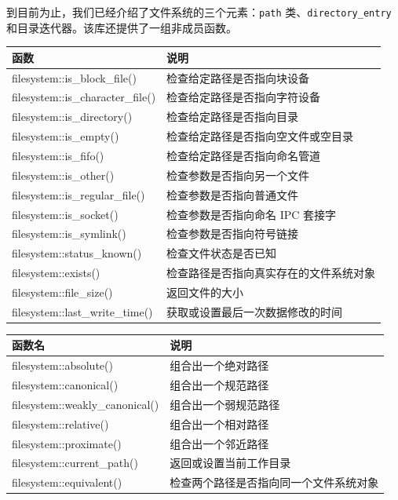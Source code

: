 到目前为止，我们已经介绍了文件系统的三个元素：\texttt{path} 类、\texttt{directory\_entry} 和目录迭代器。该库还提供了一组非成员函数。


\begin{table}[H]
\centering
\begin{tabularx}{\textwidth}{>{\ttfamily\raggedright\arraybackslash}X >{\raggedright\arraybackslash}X}
\toprule
函数 & 说明 \\
\midrule
filesystem::is\_block\_file() & 检查给定路径是否指向块设备 \\
filesystem::is\_character\_file() & 检查给定路径是否指向字符设备 \\
filesystem::is\_directory() & 检查给定路径是否指向目录 \\
filesystem::is\_empty() & 检查给定路径是否指向空文件或空目录 \\
filesystem::is\_fifo() & 检查给定路径是否指向命名管道 \\
filesystem::is\_other() & 检查参数是否指向另一个文件 \\
filesystem::is\_regular\_file() & 检查参数是否指向普通文件 \\
filesystem::is\_socket() & 检查参数是否指向命名 IPC 套接字 \\
filesystem::is\_symlink() & 检查参数是否指向符号链接 \\
filesystem::status\_known() & 检查文件状态是否已知 \\
filesystem::exists() & 检查路径是否指向真实存在的文件系统对象 \\
filesystem::file\_size() & 返回文件的大小 \\
filesystem::last\_write\_time() & 获取或设置最后一次数据修改的时间 \\
\bottomrule
\end{tabularx}
\end{table}


\begin{table}[H]
\centering
\begin{tabularx}{\textwidth}{>{\ttfamily\raggedright\arraybackslash}X >{\raggedright\arraybackslash}X}
\toprule
函数名 & 说明 \\
\midrule
filesystem::absolute() & 组合出一个绝对路径 \\
filesystem::canonical() & 组合出一个规范路径 \\
filesystem::weakly\_canonical() & 组合出一个弱规范路径 \\
filesystem::relative() & 组合出一个相对路径 \\
filesystem::proximate() & 组合出一个邻近路径 \\
filesystem::current\_path() & 返回或设置当前工作目录 \\
filesystem::equivalent() & 检查两个路径是否指向同一个文件系统对象 \\
\bottomrule
\end{tabularx}
\end{table}

